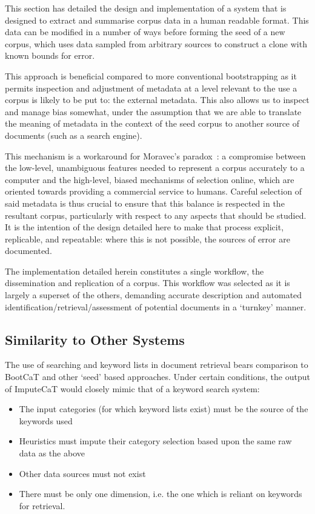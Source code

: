 

This section has detailed the design and implementation of a system that is designed to extract and summarise corpus data in a human readable format.  This data can be modified in a number of ways before forming the seed of a new corpus, which uses data sampled from arbitrary sources to construct a clone with known bounds for error.

This approach is beneficial compared to more conventional bootstrapping as it permits inspection and adjustment of metadata at a level relevant to the use a corpus is likely to be put to: the external metadata.  This also allows us to inspect and manage bias somewhat, under the assumption that we are able to translate the meaning of metadata in the context of the seed corpus to another source of documents (such as a search engine).

This mechanism is a workaround for Moravec's paradox~\cite{moravec1988mind}: a compromise between the low-level, unambiguous features needed to represent a corpus accurately to a computer and the high-level, biased mechanisms of selection online, which are oriented towards providing a commercial service to humans.  Careful selection of said metadata is thus crucial to ensure that this balance is respected in the resultant corpus, particularly with respect to any aspects that should be studied.  It is the intention of the design detailed here to make that process explicit, replicable, and repeatable: where this is not possible, the sources of error are documented.

The implementation detailed herein constitutes a single workflow, the dissemination and replication of a corpus.  This workflow was selected as it is largely a superset of the others, demanding accurate description and automated identification/retrieval/assessment of potential documents in a `turnkey' manner.


\subsection{Similarity to Other Systems}
The use of searching and keyword lists in document retrieval bears comparison to BootCaT and other `seed' based approaches.  Under certain conditions, the output of ImputeCaT would closely mimic that of a keyword search system:

\begin{itemize}
    \item The input categories (for which keyword lists exist) must be the source of the keywords used
    \item Heuristics must impute their category selection based upon the same raw data as the above
    \item Other data sources must not exist
    \item There must be only one dimension, i.e. the one which is reliant on keywords for retrieval.
\end{itemize}

